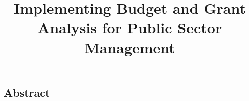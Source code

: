 \documentclass[12pt,oneside,a4paper]{book} %
\title{Implementing Budget and Grant Analysis for Public Sector Management}
\begin{document}
	\maketitle
	\newpage
	\begin{spacing}{1.5}
		
		\newpage
		
		\newpage
		
		\newpage
		\chapter*{Abstract}
		
	\end{spacing}
	\newpage
	\pagestyle{fplain}
	\begin{spacing}{1.5}
		\tableofcontents
	\end{spacing}
	\newpage
	\begin{spacing}{1.5}
		\cleardoublepage
		\listoffigures
	\end{spacing}
	\newpage
	\begin{spacing}{1.5}
		\cleardoublepage
		\listoftables
	\end{spacing}
	\newpage

	\newpage
	\printglossary[type=\acronymtype, title= Abbreviations, toctitle=Abbreviations]


	\mainmatter
	\pagestyle{mplain}
	\glsresetall
	\begin{spacing}{1.5}
		





		
		\backmatter
		\clearpage
		\printbibliography%
	\end{spacing}
\end{document}
